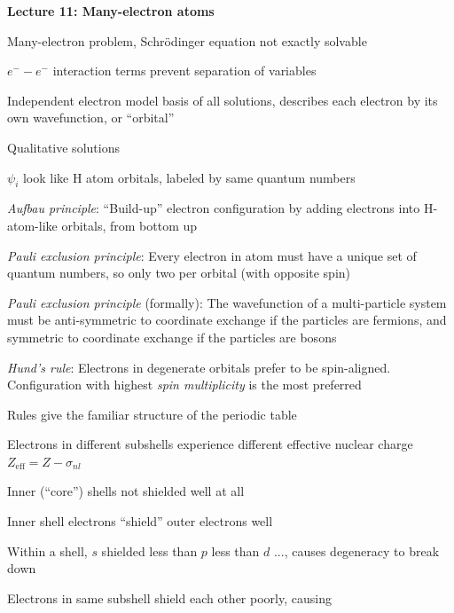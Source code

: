 \documentclass[11pt]{article}
\begin{document}
\begin{outline}
\item{{\bf Lecture 11: Many-electron atoms}}
  \begin{outline}
  \item Many-electron problem, Schr\"odinger equation not exactly solvable
    \begin{outline}
      \item $e^- -e^-$ interaction terms prevent separation of variables
    \end{outline}
  \item Independent electron model basis of all solutions, describes each
    electron by its own wavefunction, or ``orbital''
  \item Qualitative solutions
    \begin{outline}
    \item $\psi_i$ look like H atom orbitals,  labeled by same quantum numbers
    \item {\em Aufbau principle}: ``Build-up'' electron configuration by adding
      electrons into H-atom-like orbitals, from bottom up
    \item {\em Pauli exclusion principle}: Every electron in atom must have a unique
      set of quantum numbers, so only two per orbital (with opposite spin)
    \item {\em Pauli exclusion principle} (formally): The wavefunction of a
      multi-particle system must be anti-symmetric to coordinate exchange if
      the particles are fermions, and symmetric to coordinate exchange if the
      particles are bosons
    \item {\em Hund's rule}: Electrons in degenerate orbitals prefer to be
      spin-aligned.  Configuration with highest {\em spin multiplicity} is the
      most preferred
    \item Rules give the familiar structure of the periodic table
    \item Electrons in different subshells experience different effective nuclear
      charge $Z_\mathrm{eff} = Z - \sigma_{nl}$
      \begin{outline}
      \item Inner (``core'') shells not shielded well at all
      \item Inner shell electrons ``shield'' outer electrons well
      \item Within a shell, $s$ shielded less than $p$ less than $d$ ...,
        causes degeneracy to break down
      \item Electrons in same subshell shield each other poorly, causing

\end{outline}
\end{outline}
\end{outline}
\end{outline}
\end{document}
